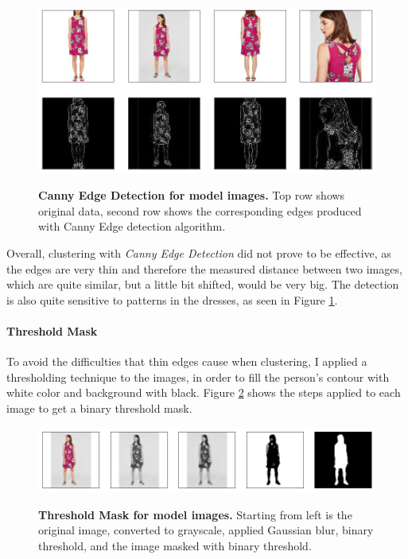 \documentclass{article}
\begin{document}
\begin{figure}[h]
\centering
{\includegraphics[width=\linewidth]{clustering/edges_data}}
\caption{\label{fig:cluster_edges_data} \textbf{Canny Edge Detection for model images.} Top row shows original data, second row shows the corresponding edges produced with Canny Edge detection algorithm.}
\end{figure}

Overall, clustering with \textit{Canny Edge Detection} did not prove to be effective, as the edges are very thin and therefore the measured distance between two images, which are quite similar, but a little bit shifted, would be very big. The detection is also quite sensitive to patterns in the dresses, as seen in Figure \ref{fig:cluster_edges_data}.

\paragraph{Threshold Mask}
To avoid the difficulties that thin edges cause when clustering, I applied a thresholding technique to the images, in order to fill the person's contour with white color and background with black. Figure \ref{fig:cluster_outline_data} shows the steps applied to each image to get a binary threshold mask.

\begin{figure}[h]
\centering
{\includegraphics[width=\linewidth]{clustering/outlines_data}}
\caption{\label{fig:cluster_outline_data} \textbf{Threshold Mask for model images.} Starting from left is the original image, converted to grayscale, applied Gaussian blur, binary threshold, and the image masked with binary threshold.}
\end{figure}
\end{document}
